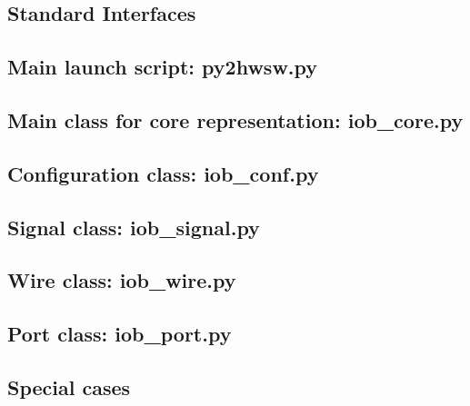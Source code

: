 \documentclass{ug}
\begin{document}
\subsection{Standard Interfaces}
\label{sec:py2_standard_interfaces}


\subsection{Main launch script: py2hwsw.py}
\label{sec:launch_script}


%
%

\subsection{Main class for core representation: iob\_core.py}
\label{sec:iob_core}


\subsection{Configuration class: iob\_conf.py}
\label{sec:iob_conf}


\subsection{Signal class: iob\_signal.py}
\label{sec:iob_signal}


\subsection{Wire class: iob\_wire.py}
\label{sec:iob_wire}


\subsection{Port class: iob\_port.py}
\label{sec:iob_port}


\subsection{Special cases}
\label{sec:special_cases}

\end{document}
